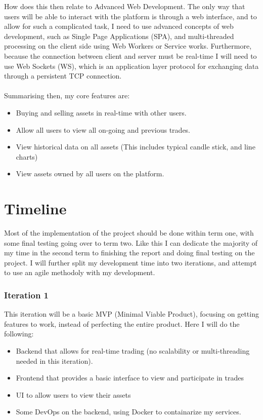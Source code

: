 \documentclass[titlepage]{article}
\begin{document}
How does this then relate to Advanced Web Development. The only way that users will be able to interact with the platform is through a web interface, and to allow for such a complicated task, I need to use advanced concepts of web development, such as Single Page Applications (SPA), and multi-threaded processing on the client side using Web Workers or Service works. Furthermore, because the connection between client and server must be real-time I will need to use Web Sockets (WS), which is an application layer protocol for exchanging data through a persistent TCP connection. \\
\\
Summarising then, my core features are:
\begin{itemize}
	\item Buying and selling assets in real-time with other users.
	\item Allow all users to view all on-going and previous trades.
	\item View historical data on all assets (This includes typical candle stick, and line charts)
	\item View assets owned by all users on the platform.
\end{itemize}

\pagebreak

\section{Timeline}
Most of the implementation of the project should be done within term one, with some final testing going over to term two. Like this I can dedicate the majority of my time in the second term to finishing the report and doing final testing on the project. I will further split my development time into two iterations, and attempt to use an agile methodoly with my development.

\subsubsection{Iteration 1}
This iteration will be a basic MVP (Minimal Viable Product), focusing on getting features to work, instead of perfecting the entire product. Here I will do the following:
\begin{itemize}
	\item Backend that allows for real-time trading (no scalability or multi-threading needed in this iteration).
	\item Frontend that provides a basic interface to view and participate in trades
	\item UI to allow users to view their assets
	\item Some DevOps on the backend, using Docker to containarize my services.
\end{itemize}
\end{document}

